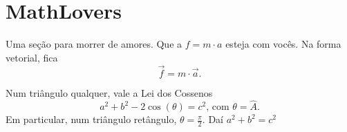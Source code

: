 \documentclass[10pt,a4paper,twocolumn]{book}
\begin{document}
		\section{MathLovers} 
			Uma seção para morrer de amores.
			Que a $f = m \cdot a $ esteja com vocês.
			Na forma vetorial, fica $$\vec{f} = m \cdot \vec{a}.$$
			
			Num triângulo qualquer, vale a Lei dos Cossenos
			\begin{equation}
				a^2 + b^2 - 2\cos(\theta) = c^2\mbox{, com } \theta = \hat{A}.
				\label{eq:leiCos}
			\end{equation}
			Em particular, num triângulo retângulo, $\theta = \frac{\pi}{2}$.
			Daí
			\begin{math}
				 a^2 + b^2 = c^2
			\end{math}
			
			
		
\end{document}
